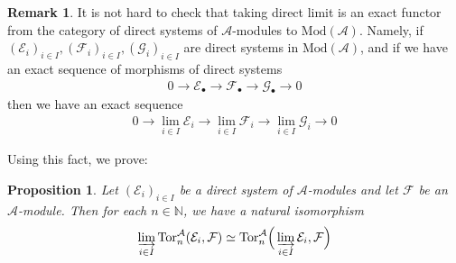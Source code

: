 \documentclass[12pt,b5paper,notitlepage]{report}
\theoremstyle{definition}
\newtheorem{rem}[df]{Remark}
\theoremstyle{plain}
\newtheorem{pp}[df]{Proposition}
\newcommand{\mc}{\mathcal}
\newcommand{\blt}{\bullet}
\newcommand{\Nbb}{\mathbb N}
\newcommand{\Tor}{\mathrm{Tor}}
\newcommand{\Mod}{\mathrm{Mod}}
\numberwithin{equation}{section}
\begin{document}
\begin{rem}\label{lb259}
It is not hard to check that taking direct limit is an exact functor from the category of direct systems of $\mc A$-modules to $\Mod(\mc A)$. Namely, if $(\mc E_i)_{i\in I},(\mc F_i)_{i\in I},(\mc G_i)_{i\in I}$ are direct systems in $\Mod(\mc A)$, and if we have an exact sequence of morphisms of direct systems
\begin{align*}
0\rightarrow\mc E_\blt\rightarrow\mc F_\blt\rightarrow\mc G_\blt\rightarrow0
\end{align*}
then we have an exact sequence
\begin{align*}
0\rightarrow\lim_{i\in I}\mc E_i\rightarrow\lim_{i\in I}\mc F_i\rightarrow\lim_{i\in I}\mc G_i\rightarrow0
\end{align*}
\end{rem}

Using this fact, we prove:

\begin{pp}\label{lb260}
Let $(\mc E_i)_{i\in I}$ be a direct system of $\mc A$-modules and let $\mc F$ be an $\mc A$-module. Then for each $n\in\Nbb$, we have a natural isomorphism
\begin{gather}\label{eq120}
\varinjlim_{i\in I}\Tor_n^{\mc A}(\mc E_i,\mc F)\simeq\Tor_n^{\mc A}\Big(\varinjlim_{i\in I}\mc E_i,\mc F\Big)
\end{gather}
\end{pp}
\end{document}
